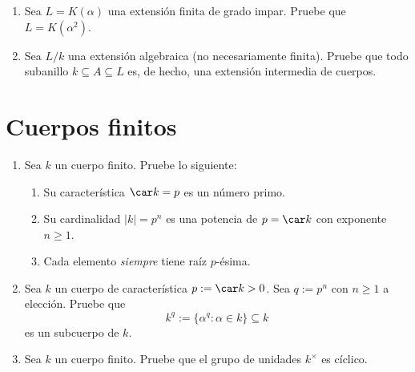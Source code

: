 \documentclass[11pt, reqno]{amsart}
\begin{document}
\begin{enumerate}
	\item Sea $L = K(\alpha)$ una extensión finita de grado impar.
		Pruebe que $L = K(\alpha^2)$.


	\item Sea $L/k$ una extensión algebraica (no necesariamente finita).
		Pruebe que todo subanillo $k \subseteq A \subseteq L$ es, de hecho, una extensión intermedia de cuerpos.
\end{enumerate}

\section{Cuerpos finitos}
\begin{enumerate}[resume]
	\item Sea $k$ un cuerpo finito. Pruebe lo siguiente:
		\begin{enumerate}
			\item Su característica $\car k = p$ es un número primo.
			\item Su cardinalidad $|k| = p^n$ es una potencia de $p = \car k$ con exponente $n \ge 1$.
			\item Cada elemento \emph{siempre} tiene raíz $p$-ésima.
		\end{enumerate}

	\item Sea $k$ un cuerpo de característica $p := \car k > 0$.
		Sea $q := p^n$ con $n \ge 1$ a elección.
		Pruebe que
		\[
			k^q := \{ \alpha^q : \alpha \in k \} \subseteq k
		\]
		es un subcuerpo de $k$.


	\item Sea $k$ un cuerpo finito.
		Pruebe que el grupo de unidades $k^\times$ es cíclico.

\end{enumerate}

\nocite{lang:algebra, nagata:fields}

\printbibliography
\end{document}
